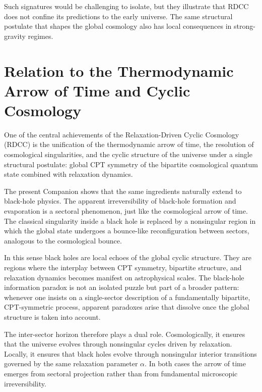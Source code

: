 \documentclass[11pt,a4paper]{article}
\begin{document}
Such signatures would be challenging to isolate, but they illustrate that RDCC does not
confine its predictions to the early universe. The same structural postulate that shapes the
global cosmology also has local consequences in strong-gravity regimes.


\section{Relation to the Thermodynamic Arrow of Time and Cyclic Cosmology}

One of the central achievements of the Relaxation-Driven Cyclic Cosmology (RDCC) is the
unification of the thermodynamic arrow of time, the resolution of cosmological singularities,
and the cyclic structure of the universe under a single structural postulate: global CPT
symmetry of the bipartite cosmological quantum state combined with relaxation dynamics.

The present Companion shows that the same ingredients naturally extend to black-hole
physics. The apparent irreversibility of black-hole formation and evaporation is a sectoral
phenomenon, just like the cosmological arrow of time. The classical singularity inside a
black hole is replaced by a nonsingular region in which the global state undergoes a
bounce-like reconfiguration between sectors, analogous to the cosmological bounce.

In this sense black holes are local echoes of the global cyclic structure. They are regions
where the interplay between CPT symmetry, bipartite structure, and relaxation dynamics
becomes manifest on astrophysical scales. The black-hole information paradox is not an
isolated puzzle but part of a broader pattern: whenever one insists on a single-sector
description of a fundamentally bipartite, CPT-symmetric process, apparent paradoxes
arise that dissolve once the global structure is taken into account.

The inter-sector horizon therefore plays a dual role. Cosmologically, it ensures that the
universe evolves through nonsingular cycles driven by relaxation. Locally, it ensures that
black holes evolve through nonsingular interior transitions governed by the same
relaxation parameter $\alpha$. In both cases the arrow of time emerges from sectoral
projection rather than from fundamental microscopic irreversibility.
\end{document}
